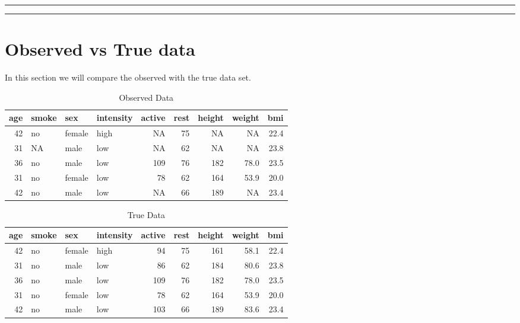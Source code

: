 \documentclass[
]{article}
\begin{document}
\begin{center}\rule{0.5\linewidth}{0.5pt}\end{center}

\begin{center}\rule{0.5\linewidth}{0.5pt}\end{center}

\hypertarget{data}{%
\section{Observed vs True data}\label{data}}

In this section we will compare the observed with the true data set.

\begin{table}

\caption{\label{tab:obsData}Observed Data}
\centering
\begin{tabular}[t]{r|l|l|l|r|r|r|r|r}
\hline
age & smoke & sex & intensity & active & rest & height & weight & bmi\\
\hline
42 & no & female & high & NA & 75 & NA & NA & 22.4\\
\hline
31 & NA & male & low & NA & 62 & NA & NA & 23.8\\
\hline
36 & no & male & low & 109 & 76 & 182 & 78.0 & 23.5\\
\hline
31 & no & female & low & 78 & 62 & 164 & 53.9 & 20.0\\
\hline
42 & no & male & low & NA & 66 & 189 & NA & 23.4\\
\hline
\end{tabular}
\end{table}

\begin{table}

\caption{\label{tab:obsData}True Data}
\centering
\begin{tabular}[t]{r|l|l|l|r|r|r|r|r}
\hline
age & smoke & sex & intensity & active & rest & height & weight & bmi\\
\hline
42 & no & female & high & 94 & 75 & 161 & 58.1 & 22.4\\
\hline
31 & no & male & low & 86 & 62 & 184 & 80.6 & 23.8\\
\hline
36 & no & male & low & 109 & 76 & 182 & 78.0 & 23.5\\
\hline
31 & no & female & low & 78 & 62 & 164 & 53.9 & 20.0\\
\hline
42 & no & male & low & 103 & 66 & 189 & 83.6 & 23.4\\
\hline
\end{tabular}
\end{table}
\end{document}
